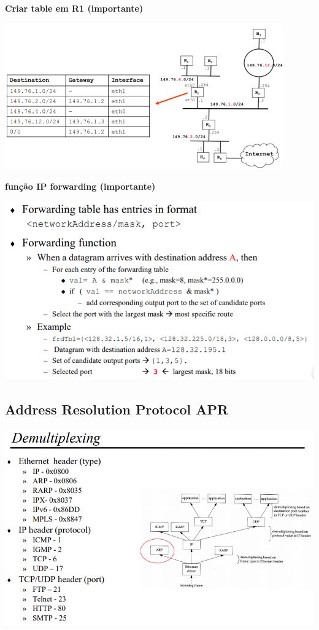 \documentclass[../resumosRCOM.tex]{subfiles}
\begin{document}
\textbf{Criar table em R1 (importante)}
\begin{center}
    \includegraphics[width=12cm]{images/RCOM21.png}
\end{center}

\textbf{função IP forwarding (importante)}
\begin{center}
    \includegraphics[width=15cm]{images/RCOM22.png}
\end{center}

\subsection{Address Resolution Protocol APR}
\begin{center}
    \includegraphics[width=14cm]{images/RCOM23.png}
\end{center}
\end{document}
